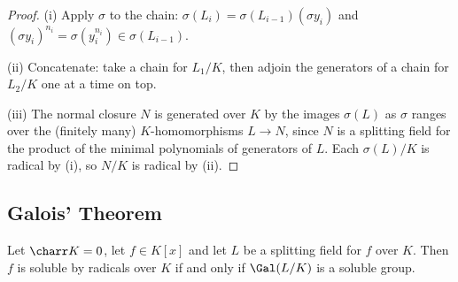 \begin{proof}
	(i) Apply $\sigma$ to the chain: $\sigma(L_i) = \sigma(L_{i-1})(\sigma y_i)$ and $(\sigma y_i)^{n_i} = \sigma(y_i^{n_i})\in\sigma(L_{i-1})$.

	(ii) Concatenate: take a chain for $L_1/K$, then adjoin the generators of a chain for $L_2/K$ one at a time on top.

	(iii) The normal closure $N$ is generated over $K$ by the images $\sigma(L)$ as $\sigma$ ranges over the (finitely many) $K$-homomorphisms $L \to N$, since $N$ is a splitting field for the product of the minimal polynomials of generators of $L$. Each $\sigma(L)/K$ is radical by (i), so $N/K$ is radical by (ii).
\end{proof}

\subsection{Galois' Theorem}

\begin{theorem}[Galois]\label{thm:galoissoluble}
	Let $\charr K = 0$, let $f \in K[x]$ and let $L$ be a splitting field for $f$ over $K$. Then $f$ is soluble by radicals over $K$ if and only if $\Gal(L/K)$ is a soluble group.
\end{theorem}

